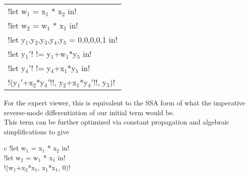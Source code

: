 \begin{example}
    \begin{center}
            \begin{tabular}{l}
                !let w$_1$ = x$_1$ * x$_2$ in!\\ 
                !let w$_2$ = w$_1$ * x$_1$ in!\\
                !let y$_1$,y$_2$,y$_3$,y$_4$,y$_5$ = 0,0,0,0,1 in!\\
                !let y$_1'$! != y$_1$+w$_1$*y$_5$ in!\\
                !let y$_4'$! != y$_4$+x$_1$*y$_5$ in!\\
                !(y$_1'$+x$_2$*y$_4'$!!, y$_2$+x$_1$*y$_4'$!!, y$_3$)!
            \end{tabular}
    \end{center}   
For the expert viewer, this is equivalent to the SSA form \cite{cytron1989efficient} of what the imperative reverse-mode differentiation of our initial term would be.\\
This term can be further optimized via constant propagation and algebraic simplifications to give
        \begin{center}
            \begin{tabular}{{c}}
                !let w$_1$ = x$_1$ * x$_2$ in!\\ 
                !let w$_2$ = w$_1$ * x$_1$ in!\\
                !(w$_1$+x$_2$*x$_1$, x$_1$*x$_1$, 0)!
            \end{tabular}
        \end{center}
    \end{example}

